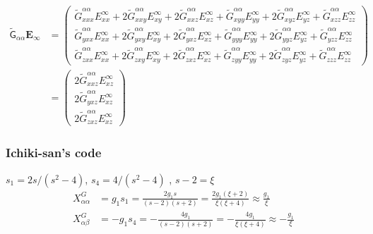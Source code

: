 \documentclass[12pt]{article}
\newcommand{\tens}[1]{\bm{\mathsf{#1}}}
\begin{document}
\begin{align}
 \tilde{\tens{G}}_{\alpha\alpha} \bm{E}_{\infty}
&= 
\begin{pmatrix}
 \tilde{G}^{\alpha\alpha}_{x xx} E_{xx}^{\infty}
+ 2\tilde{G}^{\alpha\alpha}_{x xy} E_{xy}^{\infty}
+ 2\tilde{G}^{\alpha\alpha}_{x xz} E_{xz}^{\infty}
+  \tilde{G}^{\alpha\alpha}_{x yy} E_{yy}^{\infty}
+ 2\tilde{G}^{\alpha\alpha}_{x yz} E_{yz}^{\infty}
+  \tilde{G}^{\alpha\alpha}_{x zz} E_{zz}^{\infty} 
\\
\tilde{G}^{\alpha\alpha}_{y xx} E_{xx}^{\infty}
+ 2\tilde{G}^{\alpha\alpha}_{y xy} E_{xy}^{\infty}
+ 2\tilde{G}^{\alpha\alpha}_{y xz} E_{xz}^{\infty}
+  \tilde{G}^{\alpha\alpha}_{y yy} E_{yy}^{\infty}
+ 2\tilde{G}^{\alpha\alpha}_{y yz} E_{yz}^{\infty}
+  \tilde{G}^{\alpha\alpha}_{y zz} E_{zz}^{\infty} 
\\
 \tilde{G}^{\alpha\alpha}_{z xx} E_{xx}^{\infty}
+ 2\tilde{G}^{\alpha\alpha}_{z xy} E_{xy}^{\infty}
+ 2\tilde{G}^{\alpha\alpha}_{z xz} E_{xz}^{\infty}
+  \tilde{G}^{\alpha\alpha}_{z yy} E_{yy}^{\infty}
+ 2\tilde{G}^{\alpha\alpha}_{z yz} E_{yz}^{\infty}
+  \tilde{G}^{\alpha\alpha}_{z zz} E_{zz}^{\infty} 
\end{pmatrix}
\\
&=
\begin{pmatrix}
 2\tilde{G}^{\alpha\alpha}_{x xz} E_{xz}^{\infty}
\\
 2\tilde{G}^{\alpha\alpha}_{y xz} E_{xz}^{\infty}
\\
 2\tilde{G}^{\alpha\alpha}_{z xz} E_{xz}^{\infty}
\end{pmatrix}
\end{align}

\subsubsection*{Ichiki-san's code}
$s_1 = 2 s / (s^2-4)$, $s_4 = 4 / (s^2-4)$ , $s-2 = \xi $
\begin{align*}
 X^{G}_{\alpha\alpha} &= g_1 s_1 = \frac{2g_1 s }{(s-2)(s+2)} = 
\frac{2g_1 (\xi+2) }{\xi(\xi+4)} \approx  \frac{g_1  }{\xi }  \\
 X^{G}_{\alpha\beta} &= -g_1 s_4 = - \frac{4g_1  }{(s-2)(s+2)}
= - \frac{4g_1  }{\xi(\xi+4)} 
\approx - \frac{ g_1  }{\xi} 
\end{align*}
\end{document}
